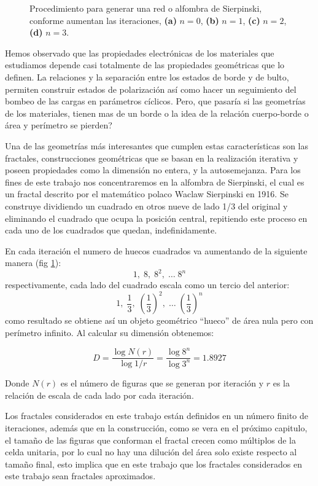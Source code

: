 \begin{figure}[tbh!]
\begin{subfigure}[b!]{0.25 \textwidth}
     \end{subfigure}
        \caption{Procedimiento para generar una red o alfombra de Sierpinski, conforme aumentan las iteraciones, \textbf{(a)} $n=0$, \textbf{(b)} $n=1$, \textbf{(c)} $n=2$,\textbf{(d)} $n=3$.}
        \label{fig:Fractals}
\end{figure}

Hemos observado que las propiedades electrónicas de los materiales que estudiamos depende casi totalmente de las propiedades geométricas que lo definen. La relaciones y la separación entre los estados de borde y de bulto, permiten construir estados de polarización así como hacer un seguimiento del bombeo de las cargas en parámetros cíclicos. Pero, que pasaría si las geometrías de los materiales, tienen mas de un borde o la idea de la relación cuerpo-borde o área y perímetro se pierden? 

Una de las geometrías más interesantes que cumplen estas características son las fractales, construcciones geométricas que se basan en la realización iterativa y poseen propiedades como la dimensión no entera, y la autosemejanza. Para los fines de este trabajo nos concentraremos en la alfombra de Sierpinski, el cual es un fractal descrito por el matemático polaco Waclaw Sierpinski en 1916. Se construye dividiendo un cuadrado en otros nueve de lado 1/3 del original y eliminando el cuadrado que ocupa la posición central, repitiendo este proceso en cada uno de los cuadrados que
quedan, indefinidamente.

En cada iteración el numero de huecos cuadrados va aumentando de la siguiente manera (fig \ref{fig:Fractals}):
\begin{equation}
    1,\; 8, \; 8^2,\;\dots\; 8^n
\end{equation}
respectivamente, cada lado del cuadrado escala como un tercio del anterior:
\begin{equation}
    1,\; \frac{1}{3}, \; \left( \frac{1}{3} \right)^2,\;\dots\; \left( \frac{1}{3} \right)^n
\end{equation}
como resultado se obtiene así un objeto geométrico “hueco” de área nula pero con perímetro infinito. Al calcular su dimensión obtenemos:

\begin{equation}
    D = \frac{\log N(r)}{\log 1/r} = \frac{\log 8^n}{\log 3^n} = 1.8927
\end{equation}

Donde $N(r)$ es el número de figuras que se generan por iteración y $r$ es la relación de escala de cada lado por cada iteración.

Los fractales considerados en este trabajo están definidos en un número finito de iteraciones, además que en la construcción, como se vera en el próximo capitulo, el tamaño de las figuras que conforman el fractal crecen como múltiplos de la celda unitaria, por lo cual no hay una dilución del área solo existe respecto al tamaño final, esto implica que en este trabajo que los fractales considerados en este trabajo sean fractales aproximados.


